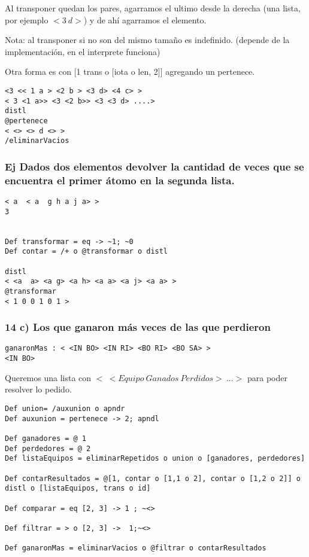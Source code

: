 Al transponer quedan los pares, agarramos el ultimo desde la derecha (una lista, por ejemplo $<3\ d>$) y de ahí agarramos el elemento.

Nota: al transponer si no son del mismo tamaño es indefinido. (depende de la implementación, en el interprete funciona)


Otra forma es con [1 trans o [iota o len, 2]] agregando un pertenece.

\begin{verbatim}
<3 << 1 a > <2 b > <3 d> <4 c> >
< 3 <1 a>> <3 <2 b>> <3 <3 d> ....>
distl
@pertenece
< <> <> d <> >
/eliminarVacios
\end{verbatim}

\subsubsection*{Ej Dados dos elementos devolver la cantidad de veces que se encuentra el primer átomo en la segunda lista.}

\begin{verbatim}
< a  < a  g h a j a> >
3


Def transformar = eq -> ~1; ~0
Def contar = /+ o @transformar o distl

distl
< <a  a> <a g> <a h> <a a> <a j> <a a> >
@transformar
< 1 0 0 1 0 1 >
\end{verbatim}


\subsubsection*{14 c) Los que ganaron más veces de las que perdieron}

\begin{verbatim}
ganaronMas : < <IN BO> <IN RI> <BO RI> <BO SA> >
<IN BO>
\end{verbatim}

Queremos una lista con $<\ < Equipo\ Ganados\ Perdidos>\ ...>$ para poder resolver lo pedido.

\begin{verbatim}
Def union= /auxunion o apndr
Def auxunion = pertenece -> 2; apndl

Def ganadores = @ 1
Def perdedores = @ 2
Def listaEquipos = eliminarRepetidos o union o [ganadores, perdedores]

Def contarResultados = @[1, contar o [1,1 o 2], contar o [1,2 o 2]] o distl o [listaEquipos, trans o id]

Def comparar = eq [2, 3] -> 1 ; ~<>

Def filtrar = > o [2, 3] ->  1;~<>

Def ganaronMas = eliminarVacios o @filtrar o contarResultados
\end{verbatim}